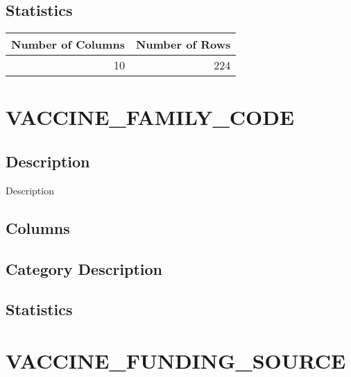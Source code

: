 \documentclass[
  letterpaper,
  DIV=11,
  numbers=noendperiod]{scrreprt}
\begin{document}
\hypertarget{statistics-46}{%
\section*{Statistics}\label{statistics-46}}

\begin{longtable}{rr}
\toprule
Number of Columns & Number of Rows \\ 
\midrule
10 & 224 \\ 
\bottomrule
\end{longtable}

\hypertarget{vaccine_family_code}{%
\chapter*{VACCINE\_FAMILY\_CODE}\label{vaccine_family_code}}

\hypertarget{description-47}{%
\section*{Description}\label{description-47}}

Description

\hypertarget{columns-47}{%
\section*{Columns}\label{columns-47}}

\hypertarget{category-description-47}{%
\section*{Category Description}\label{category-description-47}}

\hypertarget{statistics-47}{%
\section*{Statistics}\label{statistics-47}}

\hypertarget{vaccine_funding_source}{%
\chapter*{VACCINE\_FUNDING\_SOURCE}\label{vaccine_funding_source}}
\end{document}
